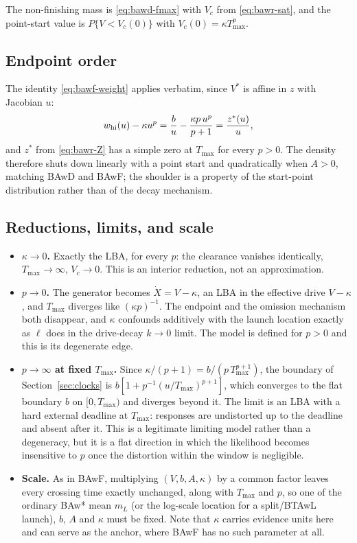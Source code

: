 \documentclass[12pt]{article}
\theoremstyle{remark}
\begin{document}
The non-finishing mass is \eqref{eq:bawd-fmax} with $V_c$ from
\eqref{eq:bawr-sat}, and the point-start value is $P\{V<V_c(0)\}$ with
$V_c(0)=\kappa T_{\max}^{p}$.

\subsection{Endpoint order}
The identity \eqref{eq:bawf-weight} applies verbatim, since $V^{*}$ is affine in $z$ with Jacobian $u$:
\[
  w_{\rm hi}(u)-\kappa u^{p}
  = \frac{b}{u}-\frac{\kappa p\,u^{p}}{p+1}
  = \frac{z^{*}(u)}{u},
\]
and $z^{*}$ from \eqref{eq:bawr-Z} has a simple zero at $T_{\max}$ for every $p>0$. The density therefore shuts down linearly with a point start and quadratically when $A>0$, matching BAwD and BAwF; the shoulder is a property of the start-point distribution rather than of the decay mechanism.

\subsection{Reductions, limits, and scale}
\begin{itemize}
  \item \textbf{$\kappa\to0$.} Exactly the LBA, for every $p$: the clearance vanishes identically, $T_{\max}\to\infty$, $V_c\to0$. This is an interior reduction, not an approximation.
  \item \textbf{$p\to0$.} The generator becomes $\dot X=V-\kappa$, an LBA in the effective drive $V-\kappa$, and $T_{\max}$ diverges like $(\kappa p)^{-1}$. The endpoint and the omission mechanism both disappear, and $\kappa$ confounds additively with the launch location exactly as $\ell$ does in the drive-decay $k\to0$ limit. The model is defined for $p>0$ and this is its degenerate edge.
  \item \textbf{$p\to\infty$ at fixed $T_{\max}$.} Since $\kappa/(p+1)=b/(p\,T_{\max}^{p+1})$, the boundary of Section~\ref{sec:clocks} is $b\left[1+p^{-1}(u/T_{\max})^{p+1}\right]$, which converges to the flat boundary $b$ on $[0,T_{\max})$ and diverges beyond it. The limit is an LBA with a hard external deadline at $T_{\max}$: responses are undistorted up to the deadline and absent after it. This is a legitimate limiting model rather than a degeneracy, but it is a flat direction in which the likelihood becomes insensitive to $p$ once the distortion within the window is negligible.
  \item \textbf{Scale.} As in BAwF, multiplying $(V,b,A,\kappa)$ by a common factor leaves every crossing time exactly unchanged, along with $T_{\max}$ and $p$, so one of the ordinary BAw* mean $m_L$ (or the log-scale location for a split/BTAwL launch), $b$, $A$ and $\kappa$ must be fixed. Note that $\kappa$ carries evidence units here and can serve as the anchor, where BAwF has no such parameter at all.
\end{itemize}
\end{document}
